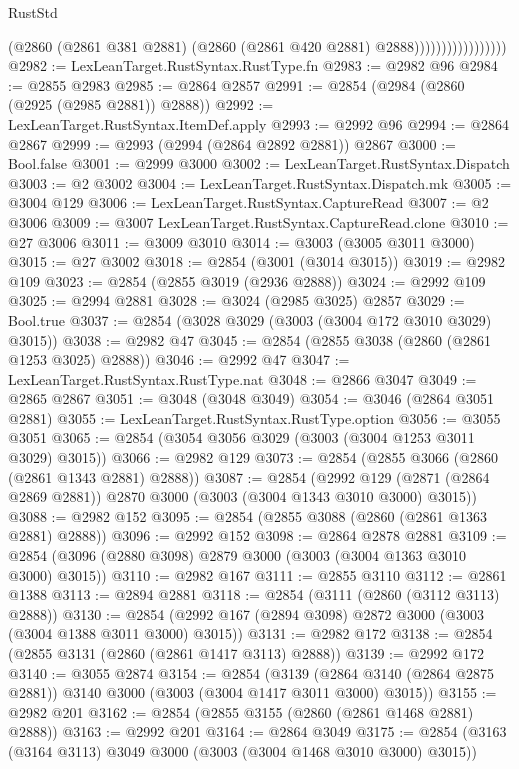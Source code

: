 \begin{lexlean}{RustStd}
\begin{coremodule}
                                  (@2860
                                    (@2861 @381 @2881)
                                    (@2860 (@2861 @420 @2881) @2888)))))))))))))))))
@2982 := LexLeanTarget.RustSyntax.RustType.fn
@2983 := @2982 @96
@2984 := @2855 @2983
@2985 := @2864 @2857
@2991 := @2854 (@2984 (@2860 (@2925 (@2985 @2881)) @2888))
@2992 := LexLeanTarget.RustSyntax.ItemDef.apply
@2993 := @2992 @96
@2994 := @2864 @2867
@2999 := @2993 (@2994 (@2864 @2892 @2881)) @2867
@3000 := Bool.false
@3001 := @2999 @3000
@3002 := LexLeanTarget.RustSyntax.Dispatch
@3003 := @2 @3002
@3004 := LexLeanTarget.RustSyntax.Dispatch.mk
@3005 := @3004 @129
@3006 := LexLeanTarget.RustSyntax.CaptureRead
@3007 := @2 @3006
@3009 := @3007 LexLeanTarget.RustSyntax.CaptureRead.clone
@3010 := @27 @3006
@3011 := @3009 @3010
@3014 := @3003 (@3005 @3011 @3000)
@3015 := @27 @3002
@3018 := @2854 (@3001 (@3014 @3015))
@3019 := @2982 @109
@3023 := @2854 (@2855 @3019 (@2936 @2888))
@3024 := @2992 @109
@3025 := @2994 @2881
@3028 := @3024 (@2985 @3025) @2857
@3029 := Bool.true
@3037 := @2854 (@3028 @3029 (@3003 (@3004 @172 @3010 @3029) @3015))
@3038 := @2982 @47
@3045 := @2854 (@2855 @3038 (@2860 (@2861 @1253 @3025) @2888))
@3046 := @2992 @47
@3047 := LexLeanTarget.RustSyntax.RustType.nat
@3048 := @2866 @3047
@3049 := @2865 @2867
@3051 := @3048 (@3048 @3049)
@3054 := @3046 (@2864 @3051 @2881)
@3055 := LexLeanTarget.RustSyntax.RustType.option
@3056 := @3055 @3051
@3065 := @2854 (@3054 @3056 @3029 (@3003 (@3004 @1253 @3011 @3029) @3015))
@3066 := @2982 @129
@3073 := @2854 (@2855 @3066 (@2860 (@2861 @1343 @2881) @2888))
@3087 := @2854
    (@2992 @129 (@2871 (@2864 @2869 @2881)) @2870 @3000 (@3003 (@3004 @1343 @3010 @3000) @3015))
@3088 := @2982 @152
@3095 := @2854 (@2855 @3088 (@2860 (@2861 @1363 @2881) @2888))
@3096 := @2992 @152
@3098 := @2864 @2878 @2881
@3109 := @2854 (@3096 (@2880 @3098) @2879 @3000 (@3003 (@3004 @1363 @3010 @3000) @3015))
@3110 := @2982 @167
@3111 := @2855 @3110
@3112 := @2861 @1388
@3113 := @2894 @2881
@3118 := @2854 (@3111 (@2860 (@3112 @3113) @2888))
@3130 := @2854 (@2992 @167 (@2894 @3098) @2872 @3000 (@3003 (@3004 @1388 @3011 @3000) @3015))
@3131 := @2982 @172
@3138 := @2854 (@2855 @3131 (@2860 (@2861 @1417 @3113) @2888))
@3139 := @2992 @172
@3140 := @3055 @2874
@3154 := @2854
    (@3139 (@2864 @3140 (@2864 @2875 @2881)) @3140 @3000 (@3003 (@3004 @1417 @3011 @3000) @3015))
@3155 := @2982 @201
@3162 := @2854 (@2855 @3155 (@2860 (@2861 @1468 @2881) @2888))
@3163 := @2992 @201
@3164 := @2864 @3049
@3175 := @2854 (@3163 (@3164 @3113) @3049 @3000 (@3003 (@3004 @1468 @3010 @3000) @3015))

\end{coremodule}
\end{lexlean}
